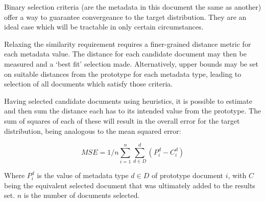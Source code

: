 Binary selection criteria (are the metadata in this document the same as another) offer a way to guarantee convergeance to the target distribution.  They are an ideal case which will be tractable in only certain circumstances.

Relaxing the similarity requirement requires a finer-grained distance metric for each metadata value.  The distance for each candidate document may then be measured and a `best fit' selection made.  Alternatively, upper bounds may be set on suitable distances from the prototype for each metadata type, leading to selection of all documents which satisfy those criteria.

Having selected candidate documents using heuristics, it is possible to estimate and then sum the distance each has to its intended value from the prototype.  The sum of squares of each of these will result in the overall error for the target distribution, being analogous to the mean squared error:

$$
MSE = 1/n\sum_{i=1}^{n}\sum_{d \in D}^{d}{(P_i^d - C_i^d)}
$$ 

Where $P_i^d$ is the value of metadata type $d \in D$ of prototype document $i$, with $C$ being the equivalent selected document that was ultimately added to the results set.  $n$ is the number of documents selected.




















%
%
%
%

